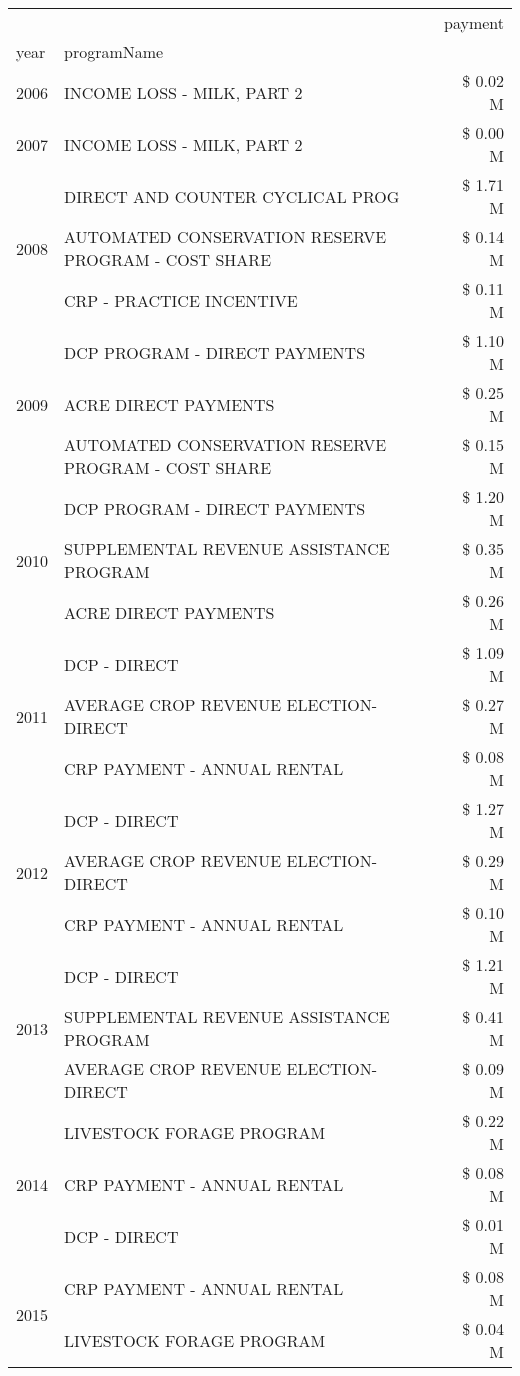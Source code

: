 \begin{tabular}{llr}
\toprule
 &  & payment \\
year & programName &  \\
\midrule
2006 & INCOME LOSS - MILK, PART 2 & \$ 0.02 M \\
\cline{1-3}
2007 & INCOME LOSS - MILK, PART 2 & \$ 0.00 M \\
\cline{1-3}
\multirow[t]{3}{*}{2008} & DIRECT AND COUNTER CYCLICAL PROG & \$ 1.71 M \\
 & AUTOMATED CONSERVATION RESERVE PROGRAM - COST SHARE & \$ 0.14 M \\
 & CRP - PRACTICE INCENTIVE & \$ 0.11 M \\
\cline{1-3}
\multirow[t]{3}{*}{2009} & DCP PROGRAM - DIRECT PAYMENTS & \$ 1.10 M \\
 & ACRE DIRECT PAYMENTS & \$ 0.25 M \\
 & AUTOMATED CONSERVATION RESERVE PROGRAM - COST SHARE & \$ 0.15 M \\
\cline{1-3}
\multirow[t]{3}{*}{2010} & DCP PROGRAM - DIRECT PAYMENTS & \$ 1.20 M \\
 & SUPPLEMENTAL REVENUE ASSISTANCE PROGRAM & \$ 0.35 M \\
 & ACRE DIRECT PAYMENTS & \$ 0.26 M \\
\cline{1-3}
\multirow[t]{3}{*}{2011} & DCP - DIRECT & \$ 1.09 M \\
 & AVERAGE CROP REVENUE ELECTION-DIRECT & \$ 0.27 M \\
 & CRP PAYMENT - ANNUAL RENTAL & \$ 0.08 M \\
\cline{1-3}
\multirow[t]{3}{*}{2012} & DCP - DIRECT & \$ 1.27 M \\
 & AVERAGE CROP REVENUE ELECTION-DIRECT & \$ 0.29 M \\
 & CRP PAYMENT - ANNUAL RENTAL & \$ 0.10 M \\
\cline{1-3}
\multirow[t]{3}{*}{2013} & DCP - DIRECT & \$ 1.21 M \\
 & SUPPLEMENTAL REVENUE ASSISTANCE PROGRAM & \$ 0.41 M \\
 & AVERAGE CROP REVENUE ELECTION-DIRECT & \$ 0.09 M \\
\cline{1-3}
\multirow[t]{3}{*}{2014} & LIVESTOCK FORAGE PROGRAM & \$ 0.22 M \\
 & CRP PAYMENT - ANNUAL RENTAL & \$ 0.08 M \\
 & DCP - DIRECT & \$ 0.01 M \\
\cline{1-3}
\multirow[t]{3}{*}{2015} & CRP PAYMENT - ANNUAL RENTAL & \$ 0.08 M \\
 & LIVESTOCK FORAGE PROGRAM & \$ 0.04 M \\

\end{tabular}
